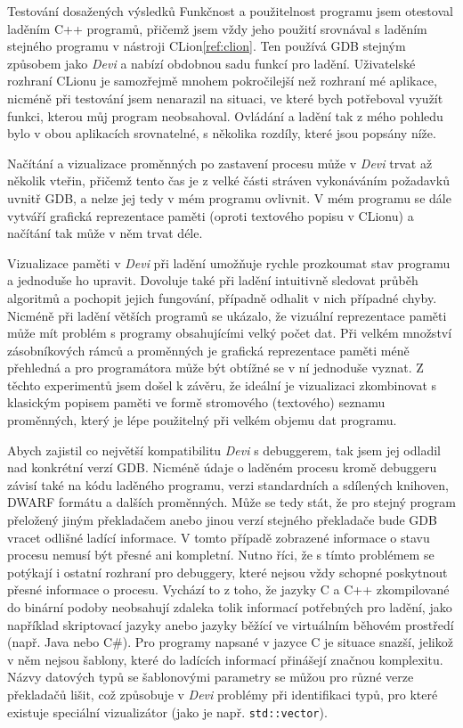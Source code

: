\documentclass[czech,bachelor,male,python,dept460]{diploma}						%
\begin{document}
\begin{section}{Testování dosažených výsledků}
	Funkčnost a použitelnost programu jsem otestoval laděním C++ programů, přičemž jsem vždy jeho použití srovnával s laděním stejného programu v nástroji
	CLion\ref{ref:clion}. Ten používá GDB stejným způsobem jako \textit{Devi} a nabízí obdobnou sadu funkcí pro ladění. Uživatelské rozhraní CLionu je
	samozřejmě mnohem pokročilejší než rozhraní mé aplikace, nicméně při testování jsem nenarazil na situaci, ve které bych potřeboval využít funkci, kterou
	můj program neobsahoval. Ovládání a ladění tak z mého pohledu bylo v obou aplikacích srovnatelné, s několika rozdíly, které jsou popsány níže.

	Načítání a vizualizace proměnných po zastavení procesu může v \textit{Devi} trvat až několik vteřin, přičemž tento čas je z velké části stráven
	vykonáváním požadavků uvnitř GDB, a nelze jej tedy v mém programu ovlivnit. V mém programu se dále vytváří grafická reprezentace paměti
	(oproti textového popisu v CLionu) a načítání tak může v něm trvat déle.

	Vizualizace paměti v \textit{Devi} při ladění umožňuje rychle prozkoumat stav programu a jednoduše ho upravit. Dovoluje také při ladění intuitivně sledovat
	průběh algoritmů a pochopit jejich fungování, případně odhalit v nich případné chyby. Nicméně při ladění větších programů se ukázalo, že vizuální
	reprezentace paměti může mít problém s programy obsahujícími velký počet dat. Při velkém množství zásobníkových rámců a proměnných je grafická reprezentace
	paměti méně přehledná a pro programátora může být obtížné se v ní jednoduše vyznat. Z těchto experimentů jsem došel k závěru, že ideální je vizualizaci
	zkombinovat s klasickým popisem paměti ve formě stromového (textového) seznamu proměnných, který je lépe použitelný při velkém objemu dat programu.
	
	Abych zajistil co největší kompatibilitu \textit{Devi} s debuggerem, tak jsem jej odladil nad konkrétní verzí GDB. Nicméně údaje o laděném procesu kromě
	debuggeru závisí také na kódu laděného programu, verzi standardních a sdílených knihoven, DWARF formátu a dalších proměnných.
	Může se tedy stát, že pro stejný program přeložený jiným překladačem anebo jinou verzí stejného překladače bude GDB vracet odlišné ladící informace.
	V tomto případě zobrazené informace o stavu procesu nemusí být přesné ani kompletní. Nutno říci, že s tímto problémem
	se potýkají i ostatní rozhraní pro debuggery, které nejsou vždy schopné poskytnout přesné informace o procesu. Vychází to z toho, že jazyky C a
	C++ zkompilované do binární podoby neobsahují zdaleka tolik informací potřebných pro ladění, jako například skriptovací jazyky anebo jazyky běžící
	ve virtuálním běhovém prostředí (např. Java nebo C\#). Pro programy napsané v jazyce C je situace snazší, jelikož v něm nejsou šablony, které do ladících
	informací přinášejí značnou komplexitu. Názvy datových typů se šablonovými parametry se můžou pro různé verze překladačů lišit, což způsobuje v \textit{Devi}
	problémy při identifikaci typů, pro které existuje speciální vizualizátor (jako je např. \texttt{std::vector}).
\end{section}
\end{document}
